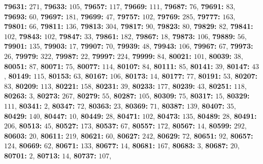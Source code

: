 \textsf{\bfseries 79631:} $271$, \textsf{\bfseries 79633:} $105$, \textsf{\bfseries 79657:} $117$, \textsf{\bfseries 79669:} $111$, \textsf{\bfseries 79687:} $76$, \textsf{\bfseries 79691:} $83$, \textsf{\bfseries 79693:} $60$, \textsf{\bfseries 79697:} $181$, \textsf{\bfseries 79699:} $47$, \textsf{\bfseries 79757:} $102$, \textsf{\bfseries 79769:} $285$, \textsf{\bfseries 79777:} $163$, \textsf{\bfseries 79801:} $66$, \textsf{\bfseries 79811:} $136$, \textsf{\bfseries 79813:} $304$, \textsf{\bfseries 79817:} $90$, \textsf{\bfseries 79823:} $80$, \textsf{\bfseries 79829:} $82$, \textsf{\bfseries 79841:} $102$, \textsf{\bfseries 79843:} $102$, \textsf{\bfseries 79847:} $33$, \textsf{\bfseries 79861:} $182$, \textsf{\bfseries 79867:} $18$, \textsf{\bfseries 79873:} $106$, \textsf{\bfseries 79889:} $56$, \textsf{\bfseries 79901:} $135$, \textsf{\bfseries 79903:} $17$, \textsf{\bfseries 79907:} $70$, \textsf{\bfseries 79939:} $48$, \textsf{\bfseries 79943:} $106$, \textsf{\bfseries 79967:} $67$, \textsf{\bfseries 79973:} $26$, \textsf{\bfseries 79979:} $322$, \textsf{\bfseries 79987:} $22$, \textsf{\bfseries 79997:} $224$, \textsf{\bfseries 79999:} $84$, \textsf{\bfseries 80021:} $101$, \textsf{\bfseries 80039:} $38$, \textsf{\bfseries 80051:} $87$, \textsf{\bfseries 80071:} $75$, \textsf{\bfseries 80077:} $114$, \textsf{\bfseries 80107:} $84$, \textsf{\bfseries 80111:} $85$, \textsf{\bfseries 80141:} $39$, \textsf{\bfseries 80147:} $43$, \textsf{\bfseries 80149:} $115$, \textsf{\bfseries 80153:} $63$, \textsf{\bfseries 80167:} $106$, \textsf{\bfseries 80173:} $14$, \textsf{\bfseries 80177:} $77$, \textsf{\bfseries 80191:} $53$, \textsf{\bfseries 80207:} $83$, \textsf{\bfseries 80209:} $113$, \textsf{\bfseries 80221:} $158$, \textsf{\bfseries 80231:} $39$, \textsf{\bfseries 80233:} $177$, \textsf{\bfseries 80239:} $43$, \textsf{\bfseries 80251:} $118$, \textsf{\bfseries 80263:} $3$, \textsf{\bfseries 80273:} $267$, \textsf{\bfseries 80279:} $55$, \textsf{\bfseries 80287:} $105$, \textsf{\bfseries 80309:} $75$, \textsf{\bfseries 80317:} $15$, \textsf{\bfseries 80329:} $111$, \textsf{\bfseries 80341:} $2$, \textsf{\bfseries 80347:} $72$, \textsf{\bfseries 80363:} $23$, \textsf{\bfseries 80369:} $71$, \textsf{\bfseries 80387:} $139$, \textsf{\bfseries 80407:} $35$, \textsf{\bfseries 80429:} $140$, \textsf{\bfseries 80447:} $10$, \textsf{\bfseries 80449:} $28$, \textsf{\bfseries 80471:} $102$, \textsf{\bfseries 80473:} $135$, \textsf{\bfseries 80489:} $28$, \textsf{\bfseries 80491:} $206$, \textsf{\bfseries 80513:} $45$, \textsf{\bfseries 80527:} $173$, \textsf{\bfseries 80537:} $67$, \textsf{\bfseries 80557:} $172$, \textsf{\bfseries 80567:} $14$, \textsf{\bfseries 80599:} $292$, \textsf{\bfseries 80603:} $20$, \textsf{\bfseries 80611:} $219$, \textsf{\bfseries 80621:} $60$, \textsf{\bfseries 80627:} $242$, \textsf{\bfseries 80629:} $72$, \textsf{\bfseries 80651:} $92$, \textsf{\bfseries 80657:} $124$, \textsf{\bfseries 80669:} $62$, \textsf{\bfseries 80671:} $133$, \textsf{\bfseries 80677:} $14$, \textsf{\bfseries 80681:} $167$, \textsf{\bfseries 80683:} $3$, \textsf{\bfseries 80687:} $20$, \textsf{\bfseries 80701:} $2$, \textsf{\bfseries 80713:} $14$, \textsf{\bfseries 80737:} $107$, 
